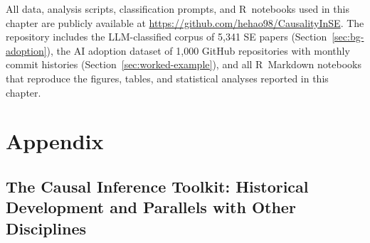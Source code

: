 All data, analysis scripts, classification prompts, and R~notebooks used in this chapter are publicly available at \url{https://github.com/hehao98/CausalityInSE}.
The repository includes the LLM-classified corpus of 5,341 SE papers (Section~\ref{sec:bg-adoption}), the AI adoption dataset of 1,000 GitHub repositories with monthly commit histories (Section~\ref{sec:worked-example}), and all R~Markdown notebooks that reproduce the figures, tables, and statistical analyses reported in this chapter.

\section{Appendix}

\let\origsection\section
\let\origsubsection\subsection
\let\section\subsection
\let\subsection\subsubsection

\section{The Causal Inference Toolkit: Historical Development and Parallels with Other Disciplines}
\label{sec:appendix-history}

